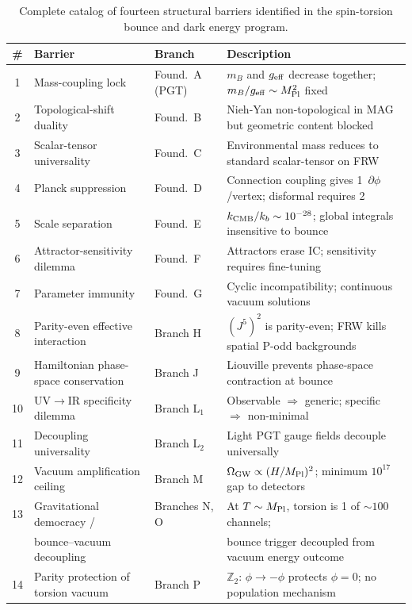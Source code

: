 \documentclass[aps,prd,twocolumn,superscriptaddress,showpacs,preprintnumbers,
  nofootinbib,longbibliography,floatfix]{revtex4-2}
\newcommand{\MPl}{M_{\rm Pl}}
\newcommand{\OmGW}{\Omega_{\rm GW}}
\newcommand{\geff}{g_{\rm eff}}
\begin{document}
\begin{table}[t]
\centering
\caption{\label{tab:barriers} Complete catalog of fourteen structural
barriers identified in the spin-torsion bounce and dark energy program.}
\begin{ruledtabular}
\begin{tabular}{clll}
\textbf{\#} & \textbf{Barrier} & \textbf{Branch} & \textbf{Description} \\
\hline
1 & Mass-coupling lock & Found.\ A (PGT) & $m_B$ and $\geff$ decrease together; $m_B/\geff \sim \MPl^2$ fixed \\
2 & Topological-shift duality & Found.\ B & Nieh-Yan non-topological in MAG but geometric content blocked \\
3 & Scalar-tensor universality & Found.\ C & Environmental mass reduces to standard scalar-tensor on FRW \\
4 & Planck suppression & Found.\ D & Connection coupling gives 1~$\partial\phi$/vertex; disformal requires 2 \\
5 & Scale separation & Found.\ E & $k_{\rm CMB}/k_b \sim 10^{-28}$; global integrals insensitive to bounce \\
6 & Attractor-sensitivity dilemma & Found.\ F & Attractors erase IC; sensitivity requires fine-tuning \\
7 & Parameter immunity & Found.\ G & Cyclic incompatibility; continuous vacuum solutions \\
8 & Parity-even effective interaction & Branch H & $(J^5)^2$ is parity-even; FRW kills spatial P-odd backgrounds \\
9 & Hamiltonian phase-space conservation & Branch J & Liouville prevents phase-space contraction at bounce \\
10 & UV$\to$IR specificity dilemma & Branch L$_1$ & Observable $\Rightarrow$ generic; specific $\Rightarrow$ non-minimal \\
11 & Decoupling universality & Branch L$_2$ & Light PGT gauge fields decouple universally \\
12 & Vacuum amplification ceiling & Branch M & $\OmGW \propto (H/\MPl)^2$; minimum $10^{17}$ gap to detectors \\
13 & Gravitational democracy / & Branches N, O & At $T\sim\MPl$, torsion is 1 of $\sim\!100$ channels; \\
   & bounce--vacuum decoupling & & bounce trigger decoupled from vacuum energy outcome \\
14 & Parity protection of torsion vacuum & Branch P & $\mathbb{Z}_2$: $\phi\to-\phi$ protects $\phi=0$; no population mechanism \\
\end{tabular}
\end{ruledtabular}
\end{table}
\end{document}
